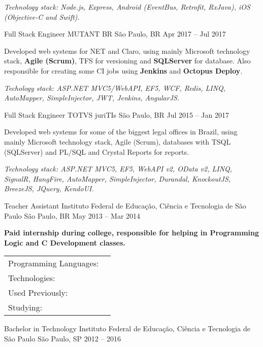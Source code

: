 \documentclass[]{awesome-cv}
\begin{document}
\begin{cventries}
{\begin{cvitems}
		\item \textit{Technology stack: Node.js, Express, Android (EventBus, Retrofit, RxJava), iOS (Objective-C and Swift).}
		\end{cvitems}}
	\cventry
	{Full Stack Engineer}
	{MUTANT BR}
	{São Paulo, BR}
	{Apr 2017 – Jul 2017}
	{\begin{cvitems}
		\item {Developed web systems for NET and Claro, using mainly Microsoft technology stack, \textbf{Agile (Scrum)}, TFS for versioning and \textbf{SQLServer} for database. Also responsible for creating some CI jobs using \textbf{Jenkins} and \textbf{Octopus Deploy}.}
		\item \textit{Techology stack: ASP.NET MVC5/WebAPI, EF5, WCF, Redis, LINQ, AutoMapper, SimpleInjector, JWT, Jenkins, AngularJS. }
		\end{cvitems}}
	\cventry
	{Full Stack Engineer}
	{TOTVS juriTIs}
	{São Paulo, BR}
	{Jul 2015 – Jan 2017}
	{\begin{cvitems}
		\item {Developed web systems for some of the biggest legal offices in Brazil, using mainly Microsoft technology stack, Agile (Scrum), databases with TSQL (SQLServer) and PL/SQL and Crystal Reports for reports.}
		\item \textit{Technology stack: ASP.NET MVC5, EF5, WebAPI v2, OData v2, LINQ, SignalR, HangFire, AutoMapper, SimpleInjector, Durandal, KnockoutJS, BreezeJS, JQuery, KendoUI.}
		\end{cvitems}}
	\cventry
	{Teacher Assistant}
	{Instituto Federal de Educação, Ciência e Tecnologia de São Paulo}
	{São Paulo, BR}
	{May 2013 – Mar 2014}
	{\begin{cvitems}
		\item \textbf{Paid internship during college, responsible for helping in Programming Logic and C Development classes.}
		\end{cvitems}}
\end{cventries}
\begin{cventries}
	\cventry
	{}
	{\def\arraystretch{1.15}{\begin{tabular}{ l l }
		Programming Languages: {\skill{ C\#, JavaScript, TypeScript }} \\
		Technologies: {\skill{ Azure, Docker, Kubernetes, ELK, Pulumi, Terraform, SQL (MS SQLServer, Postgre), No-SQL (CosmosDB, MongoDB) }} \\
		Used Previously: {\skill{Clojure, Go, Java, Python}} \\
		Studying: {\skill{ Rust, F\# }} \\
		\end{tabular}}}
	{}
	{}
	{}
\end{cventries}

\vspace{-9mm}
\begin{cventries}
	\cventry
	{Bachelor in Technology}
	{Instituto Federal de Educação, Ciência e Tecnologia de São Paulo}
	{São Paulo, SP}
	{2012 – 2016}
	{}
\end{cventries}
\end{document}

